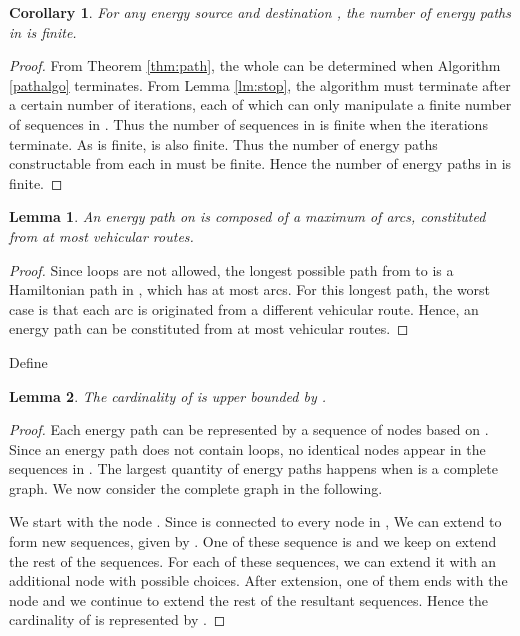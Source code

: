 \documentclass[journal]{IEEEtran}
\newtheorem{lemma}{\textbf{Lemma}}
\newtheorem{corollary}{\textbf{Corollary}}
\begin{document}
\begin{corollary}
For any energy source  and destination , the number of energy paths in  is finite.
\end{corollary}
\begin{proof}
From Theorem \ref{thm:path}, the whole  can be determined when Algorithm \ref{pathalgo} terminates. From Lemma \ref{lm:stop}, the algorithm must terminate after a certain number of iterations, each of which can only manipulate a finite number of sequences in . Thus the number of sequences in  is finite when the iterations terminate.
As  is finite,  is also finite. Thus the number of energy paths constructable from each  in  must be finite.
Hence the number of energy paths in  is finite.
\end{proof}

\begin{lemma} \label{lm:length}
An energy path  on  is composed of a maximum of  arcs, constituted from at most  vehicular routes.
\end{lemma}
\begin{proof}
Since loops are not allowed, the longest possible path from  to  is a Hamiltonian path in , which has at most  arcs.  For this longest path, the worst case is that each arc is originated from a different vehicular route. Hence, an energy path can be constituted from at most  vehicular routes.
\end{proof}

Define 

\begin{lemma} \label{lm:cardP}
The cardinality of  is upper bounded by .
\end{lemma}
\begin{proof}
Each energy path can be represented by a sequence of nodes based on . Since an energy path does not contain loops, no identical nodes appear in the sequences in . The largest quantity of energy paths happens when  is a complete graph. We now consider the complete graph in the following. 

We start with the node . Since  is connected to every node in , We can extend  to form  new sequences, given by . One of these sequence is  and we keep on extend the rest of the  sequences. For each of these sequences, we can extend it with an additional node with  possible choices. After extension, one of them ends with the node  and we continue to extend the rest of the resultant sequences. Hence the cardinality of  is represented by .
\end{proof}
\end{document}
